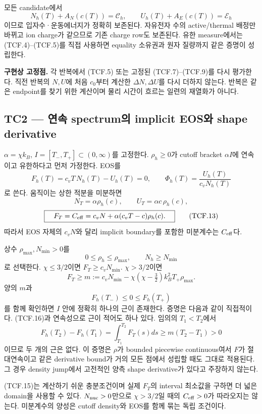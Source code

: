 \documentclass[11pt,a4paper]{article}
\begin{document}
모든 candidate에서 \[
N_h(T)+A_N(c(T))=\mathscr C_h,\qquad
U_h(T)+A_E(c(T))=\mathscr E_h
\tag{TCF.10}
\] 이므로 입자수·운동에너지가 정확히 보존된다. 자유전자 수의 active/thermal 배정만 바뀌고 ion charge가 같으므로 기존 charge row도 보존된다. 유한 measure에서는 (TCF.4)--(TCF.5)를 직접 사용하면 equality 소유권과 원자 질량까지 같은 증명이 성립한다.

\textbf{구현상 고정점.} 각 반복에서 (TCF.5) 또는 고정된 (TCF.7)--(TCF.9)를 다시 평가한다. 직전 반복의 \(N,U\)에 처음 \(c_0\)부터 계산한 \(\Delta N,\Delta U\)를 다시 더하지 않는다. 반복은 같은 endpoint를 찾기 위한 계산이며 물리 시간이 흐르는 일련의 재열화가 아니다.

\hypertarget{tc2-uxc5f0uxc18d-spectrumuxc758-implicit-eosuxc640-shape-derivative}{%
\subsection{TC2 --- 연속 spectrum의 implicit EOS와 shape derivative}\label{tc2-uxc5f0uxc18d-spectrumuxc758-implicit-eosuxc640-shape-derivative}}

\(\alpha=\chi k_B\), \(I=[T_-,T_+]\subset(0,\infty)\)를 고정한다. \(\rho_h\ge0\)가 cutoff bracket \(\alpha I\)에 연속이고 유한하다고 먼저 가정한다. EOS를 \[
F_h(T)=c_vT\,N_h(T)-U_h(T)=0,\qquad
\Phi_h(T)=\frac{U_h(T)}{c_vN_h(T)}
\tag{TCF.11}
\] 로 쓴다. 움직이는 상한 적분을 미분하면 \[
N_T=\alpha\rho_h(c),\qquad
U_T=\alpha c\,\rho_h(c),
\tag{TCF.12}
\] \[
\boxed{\quad
F_T=C_{\rm eff}=c_vN+\alpha(c_vT-c)\rho_h(c).
\quad}
\tag{TCF.13}
\] 따라서 EOS 자체의 \(c_vN\)와 달리 implicit boundary를 포함한 미분계수는 \(C_{\rm eff}\)다.

상수 \(\rho_{\max},N_{\min}>0\)를 \[
0\le\rho_h\le\rho_{\max},\qquad N_h\ge N_{\min}
\tag{TCF.14}
\] 로 선택한다. \(\chi\le3/2\)이면 \(F_T\ge c_vN_{\min}\). \(\chi>3/2\)이면 \[
F_T\ge m:=
c_vN_{\min}
-\chi(\chi-\tfrac32)k_B^2T_+\rho_{\max}.
\tag{TCF.15}
\] 양의 \(m\)과 \[
F_h(T_-)\le0\le F_h(T_+)
\tag{TCF.16}
\] 를 함께 확인하면 \(I\) 안에 정확히 하나의 근이 존재한다. 증명은 다음과 같이 직접적이다. (TCF.16)과 연속성으로 근이 적어도 하나 있다. 임의의 \(T_1<T_2\)에서 \[
F_h(T_2)-F_h(T_1)=\int_{T_1}^{T_2}F_T(s)ds\ge m(T_2-T_1)>0
\tag{TCF.17}
\] 이므로 두 개의 근은 없다. 이 증명은 \(\rho\)가 bounded piecewise continuous여서 \(F\)가 절대연속이고 같은 derivative bound가 거의 모든 점에서 성립할 때도 그대로 적용된다. 그 경우 density jump에서 고전적인 양측 shape derivative가 있다고 주장하지 않는다.

(TCF.15)는 계산하기 쉬운 충분조건이며 실제 \(F_T\)의 interval 최소값을 구하면 더 넓은 domain을 사용할 수 있다. \(N_{\rm nuc}>0\)만으로 \(\chi>3/2\)일 때의 \(C_{\rm eff}>0\)가 따라오지는 않는다. 미분계수의 양성은 cutoff density와 EOS를 함께 묶는 독립 조건이다.
\end{document}
